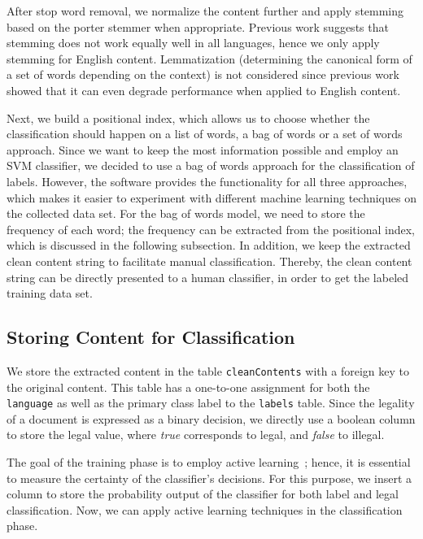 After stop word removal, we normalize the content further and apply stemming \cite{WormerStemmer} based on the porter stemmer \cite{porter1980algorithm} when appropriate. Previous work \cite{Harman1991,hull1996stemming,krovetz1996word,SaltonTextProcessing} suggests that stemming does not work equally well in all languages, hence we only apply stemming for English content. Lemmatization (determining the canonical form of a set of words depending on the context) is not considered since previous work showed that it can even degrade performance when applied to English content.

Next, we build a positional index, which allows us to choose whether the classification should happen on a list of words, a bag of words or a set of words approach. Since we want to keep the most information possible and employ an SVM classifier, we decided to use a bag of words approach for the classification of labels. However, the software provides the functionality for all three approaches, which makes it easier to experiment with different machine learning techniques on the collected data set. For the bag of words model, we need to store the frequency of each word; the frequency can be extracted from the positional index, which is discussed in the following subsection. 
In addition, we keep the extracted clean content string to facilitate manual classification. Thereby, the clean content string can be directly presented to a human classifier, in order to get the labeled training data set.
%
%
\subsection{Storing Content for Classification}
We store the extracted content in the table \texttt{cleanContents} with a foreign key to the original content. This table has a one-to-one assignment for both the \texttt{language} as well as the primary class label to the \texttt{labels} table. Since the legality of a document is expressed as a binary decision, we directly use a boolean column to store the legal value, where \emph{true} corresponds to legal, and \emph{false} to illegal.

The goal of the training phase is to employ active learning~\cite{Xu2009}; hence, it is essential to measure the certainty of the classifier's decisions. For this purpose, we insert a column to store the probability output of the classifier for both label and legal classification. Now, we can apply active learning techniques in the classification phase.

